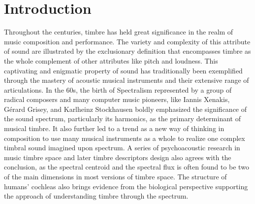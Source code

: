 \documentclass{article}
\title{\papertitle}
\begin{document}
%
\capstartfalse
\maketitle
\capstarttrue
%
\begin{abstract}
The idea of spectral music and spectral modeling has been around for decades during which many models are established for MIR or generative purposes. However, when it comes to synthetic scenarios, most spectral representations, if not all of them, suffer from the trade-off between the capability and perfectness of synthesis and the controllability of the parameters. This problem leads to a high dependency on the reference sounds thus limiting the exploration of musical timbre with spectral approaches. This work dedicates to defining a set of control parameters on the morphology of the spectrogram with good interpretability and an acceptable amount. A parameter interface and a graphic interface are also designed based on this representation which realizes an interface for spectral sound design from scratch for real-world users. In the end, a discussion is initiated by this work on the potential and significance of spectral synthesis in both acoustic research and music creation.
\end{abstract}
%

\section{Introduction}\label{sec:introduction}

Throughout the centuries, timbre has held great significance in the realm of music composition and performance. The variety and complexity of this attribute of sound are illustrated by the exclusionary definition that encompasses timbre as the whole complement of other attributes like pitch and loudness\cite{ANSI:1960}. This captivating and enigmatic property of sound has traditionally been exemplified through the mastery of acoustic musical instruments and their extensive range of articulations. In the 60s, the birth of Spectralism represented by a group of radical composers and many computer music pioneers, like Iannis Xenakis, Gérard Grisey, and Karlheinz Stockhausen boldly emphasized the significance of the sound spectrum, particularly its harmonics, as the primary determinant of musical timbre. It also further led to a trend as a new way of thinking in composition to use many musical instruments as a whole to realize one complex timbral sound imagined upon spectrum. A series of psychoacoustic research in music timbre space\cite{Wessel:1979}\cite{Grey:1977}\cite{mcadams:1995} and later timbre descriptors design\cite{Peeters:2011}\cite{Caetano:2010}\cite{Jiang:2020}\cite{zacharakis:2012} also agrees with the conclusion, as the spectral centroid and the spectral flux is often found to be two of the main dimensions in most versions of timbre space. The structure of humans' cochleas also brings evidence from the biological perspective supporting the approach of understanding timbre through the spectrum.
\end{document}

